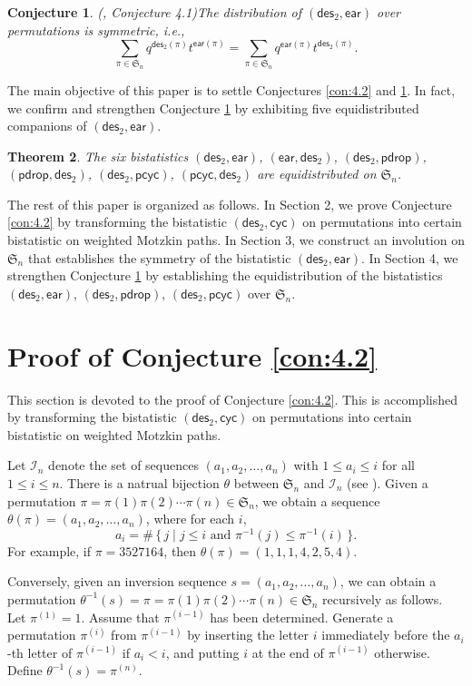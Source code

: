 \documentclass[12pt]{article}
\numberwithin{equation}{section}
\theoremstyle{plain}
\newtheorem{theorem}{Theorem}[section]
\newtheorem{conjecture}[theorem]{Conjecture}
\def\des{\mathsf{des}}
\def\ear{\mathsf{ear}}
\def\cyc{\mathsf{cyc}}
\def\pcyc{\mathsf{pcyc}}
\def\pdrop{\mathsf{pdrop}}
\begin{document}
	\begin{conjecture}{\upshape(\cite{han2021equidistributions}, Conjecture 4.1)}\label{con4.1}
		The distribution of $(\des_2, \ear)$ over permutations is symmetric, i.e., 
		$$
		\sum_{\pi\in \mathfrak{S}_n
		}q^{\des_2(\pi)}t^{\ear(\pi)}= \sum_{\pi\in \mathfrak{S}_n
		}q^{\ear(\pi)}t^{\des_2(\pi)}.
		$$
	\end{conjecture}
	The main objective of this paper is to  settle Conjectures \ref{con:4.2} and \ref{con4.1}.  In fact, we confirm and strengthen Conjecture   \ref{con4.1} by exhibiting  five  equidistributed companions of $(\des_2, \ear)$.
	
	
	\begin{theorem}\label{thm-equi}
		The six  bistatistics $(\des_2, \ear)$,  $(\ear, \des_2)$, $(\des_2, \pdrop)$, $(\pdrop, \des_2)$,  $(\des_2, \pcyc)$, $(\pcyc, \des_2)$ are
		equidistributed on $\mathfrak{S}_n$.    
	\end{theorem}
The rest of this paper is organized as follows. In Section 2, we prove Conjecture \ref{con:4.2} by transforming the bistatistic $(\des_2, \cyc)$ on permutations into certain bistatistic on weighted Motzkin paths. In Section 3, we construct an involution on $\mathfrak{S}_n$ that establishes the symmetry of the bistatistic $(\des_2, \ear)$. In Section 4, we strengthen Conjecture \ref{con4.1} by establishing the equidistribution of the bistatistics $(\des_2, \ear)$, $(\des_2, \pdrop)$, $(\des_2, \pcyc)$ over $\mathfrak{S}_n$.
    \section{Proof of Conjecture \ref{con:4.2}}
    This section is devoted to the proof of Conjecture \ref{con:4.2}. This is accomplished by transforming the bistatistic $(\des_2, \cyc)$ on permutations into certain bistatistic  on weighted Motzkin paths.
    
    
    Let $\mathcal{I}_n$ denote the set of sequences $(a_1, a_2, \ldots, a_n)$ with $1\leq a_i\leq i$ for all $1\leq i\leq n$.  There is a natrual  bijection $\theta$ between $\mathfrak{S}_n$ and $\mathcal{I}_n$ (see \cite[Chapter 1]{ST}). Given a permutation $\pi=\pi(1)\pi(2)\cdots\pi(n)\in \mathfrak{S}_n$, we obtain a sequence $\theta(\pi)=(a_1,a_2,\ldots,a_n)$, where for each $i$,
    \[
    a_i = \#\,\{\,j \mid j\leq i \text{ and } \pi^{-1}(j)\leq \pi^{-1}(i)\,\}.
    \]
     For example, if $\pi=3527164$, then $\theta(\pi)=(1,1, 1,4,2,5,4)$.
   
   Conversely, given an inversion sequence $s=(a_1, a_2, \ldots, a_n)$, we can obtain a permutation $\theta^{-1}(s)=\pi=\pi(1)\pi(2)\cdots\pi(n)\in \mathfrak{S}_n$ recursively as follows.
   Let $\pi^{(1)}=1$. Assume that $\pi^{(i-1)}$ has been determined. Generate a permutation $\pi^{(i)}$ from $\pi^{(i-1)}$ by inserting the letter $i$ immediately before the $a_i$-th letter of $\pi^{(i-1)}$ if $a_i < i$, and putting $i$ at the end of $\pi^{(i-1)}$ otherwise. Define $\theta^{-1}(s)=\pi^{(n)}$.
    
\end{document}
